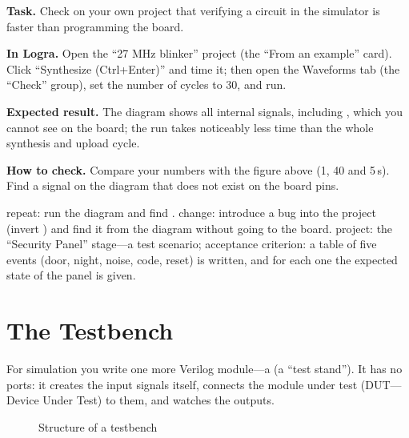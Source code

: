 \begin{diybox}
\textbf{Task.} Check on your own project that verifying a circuit in the simulator is faster than programming the board.

\textbf{In Logra.} Open the ``27 MHz blinker'' project (the ``From an example'' card). Click ``Synthesize (Ctrl+Enter)'' and time it; then open the Waveforms tab (the ``Check'' group), set the number of cycles to 30, and run.

\textbf{Expected result.} The diagram shows all internal signals, including , which you cannot see on the board; the run takes noticeably less time than the whole synthesis and upload cycle.

\textbf{How to check.} Compare your numbers with the figure above (1, 40 and 5\,s). Find a signal on the diagram that does not exist on the board pins.

 repeat: run the diagram and find .  change: introduce a bug into the project (invert ) and find it from the diagram without going to the board.  project: the ``Security Panel'' stage---a test scenario; acceptance criterion: a table of five events (door, night, noise, code, reset) is written, and for each one the expected state of the panel is given.
\end{diybox}

\section{The Testbench}

For simulation you write one more Verilog module---a 
(a ``test stand''). It has no ports: it creates the input signals itself,
connects the module under test (DUT---Device Under Test) to them, and
watches the outputs.

\begin{figure}[H]
\centering
{}
\caption{Structure of a testbench}
\end{figure}


